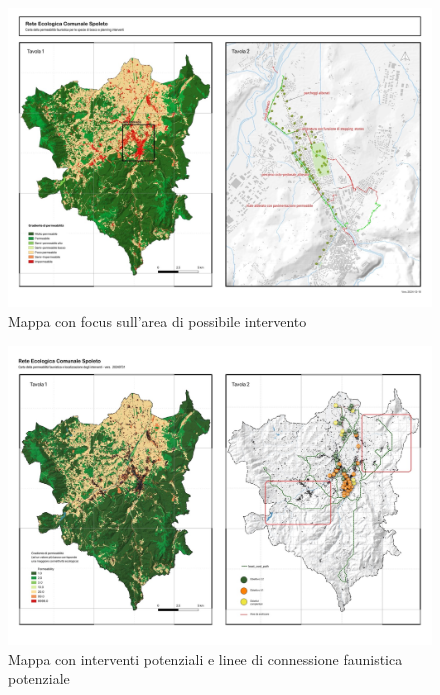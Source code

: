 \documentclass[
  a4paper,
]{book}
\begin{document}
\begin{figure}

{\centering \includegraphics[width=\linewidth]{./figs/agendaUrbana/tavolaAgendaUrbana_BiopermInterventi20241218} 

}

\caption{Mappa con focus sull'area di possibile intervento}\label{fig:agUbioperm}
\end{figure}

\begin{figure}

{\centering \includegraphics[width=\linewidth]{./figs/agendaUrbana/tavolaAgendaUrbana20240731} 

}

\caption{Mappa con interventi potenziali e linee di connessione faunistica potenziale}\label{fig:agUintev}
\end{figure}
\end{document}
